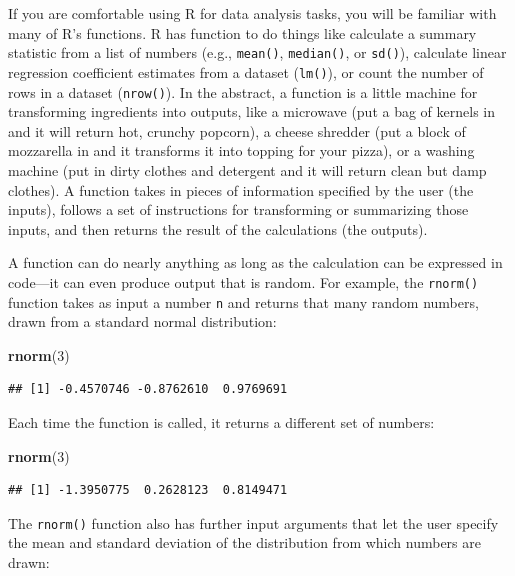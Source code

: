 \documentclass[
]{book}
\newenvironment{Shaded}{\begin{snugshade}}{\end{snugshade}}
\newcommand{\DecValTok}[1]{\textcolor[rgb]{0.00,0.00,0.81}{#1}}
\newcommand{\FunctionTok}[1]{\textcolor[rgb]{0.13,0.29,0.53}{\textbf{#1}}}
\newcommand{\NormalTok}[1]{#1}
\begin{document}
If you are comfortable using R for data analysis tasks, you will be familiar with many of R's functions.
R has function to do things like calculate a summary statistic from a list of numbers (e.g., \texttt{mean()}, \texttt{median()}, or \texttt{sd()}), calculate linear regression coefficient estimates from a dataset (\texttt{lm()}), or count the number of rows in a dataset (\texttt{nrow()}).
In the abstract, a function is a little machine for transforming ingredients into outputs, like a microwave (put a bag of kernels in and it will return hot, crunchy popcorn), a cheese shredder (put a block of mozzarella in and it transforms it into topping for your pizza), or a washing machine (put in dirty clothes and detergent and it will return clean but damp clothes).
A function takes in pieces of information specified by the user (the inputs), follows a set of instructions for transforming or summarizing those inputs, and then returns the result of the calculations (the outputs).

A function can do nearly anything as long as the calculation can be expressed in code---it can even produce output that is random.
For example, the \texttt{rnorm()} function takes as input a number \texttt{n} and returns that many random numbers, drawn from a standard normal distribution:

\begin{Shaded}
\begin{Highlighting}[]
\FunctionTok{rnorm}\NormalTok{(}\DecValTok{3}\NormalTok{)}
\end{Highlighting}
\end{Shaded}

\begin{verbatim}
## [1] -0.4570746 -0.8762610  0.9769691
\end{verbatim}

Each time the function is called, it returns a different set of numbers:

\begin{Shaded}
\begin{Highlighting}[]
\FunctionTok{rnorm}\NormalTok{(}\DecValTok{3}\NormalTok{)}
\end{Highlighting}
\end{Shaded}

\begin{verbatim}
## [1] -1.3950775  0.2628123  0.8149471
\end{verbatim}

The \texttt{rnorm()} function also has further input arguments that let the user specify the mean and standard deviation of the distribution from which numbers are drawn:
\end{document}
